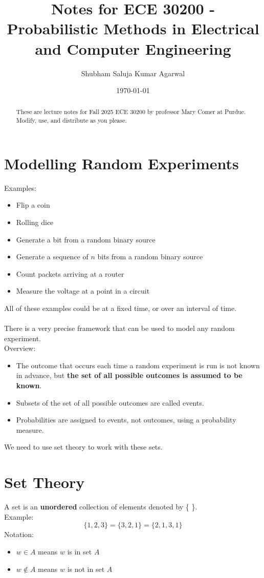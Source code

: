 \documentclass[nobib]{tufte-handout}
\title{Notes for ECE 30200 - Probabilistic Methods in Electrical and Computer Engineering}
\author[Shubham Saluja Kumar Agarwal]{Shubham Saluja Kumar Agarwal}
\date{\today}  %
\begin{document}
\maketitle

\begin{abstract}
    These are lecture notes for Fall 2025 ECE 30200 by professor Mary Comer at Purdue. Modify, use, and distribute as you please.
\end{abstract}

\tableofcontents

\newpage

\section{Modelling Random Experiments}
Examples:
\begin{itemize}
    \item Flip a coin 
    \item Rolling dice
    \item Generate a bit from a random binary source
    \item Generate a sequence of $n$ bits from a random binary source
    \item Count packets arriving at a router
    \item Measure the voltage at a point in a circuit
\end{itemize}
All of these examples could be at a fixed time, or over an interval of time.\\~\\
There is a very precise framework that can be used to model any random experiment.\\
Overview:
\begin{itemize}
    \item The outcome that occurs each time a random experiment is run is not known in advance, but \textbf{the set of all possible outcomes is assumed to be known}.
    \item Subsets of the set of all possible outcomes are called events.
    \item Probabilities are assigned to events, not outcomes, using a probability measure.
\end{itemize}
We need to use set theory to work with these sets.
\section{Set Theory}
A set is an \textbf{unordered} collection of elements denoted by \{ \}.\\
Example:
\begin{equation*}
    \{1,2,3\} = \{3,2,1\} = \{2,1,3,1\}
\end{equation*}
Notation:
\begin{itemize}
    \item $w \in A$ means $w$ is in set $A$
    \item $w \not\in A$ means $w$ is not in set $A$
\end{itemize}
\end{document}
